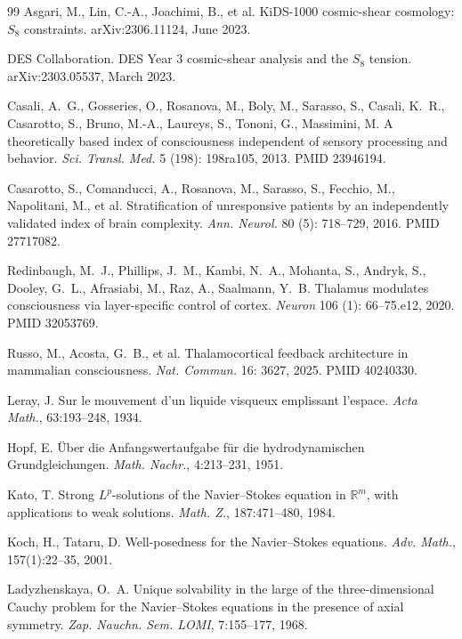 \documentclass[11pt,a4paper]{amsart}
\theoremstyle{plain}
\theoremstyle{definition}
\begin{document}
\begin{thebibliography}{99}
Asgari, M., Lin, C.-A., Joachimi, B., et al.
\newblock KiDS-1000 cosmic-shear cosmology: $S_8$ constraints.
\newblock arXiv:2306.11124, June 2023.

DES Collaboration.
\newblock DES Year 3 cosmic-shear analysis and the $S_8$ tension.
\newblock arXiv:2303.05537, March 2023.

Casali, A.~G., Gosseries, O., Rosanova, M., Boly, M., Sarasso, S., Casali, K.~R., Casarotto, S., Bruno, M.-A., Laureys, S., Tononi, G., Massimini, M.
\newblock A theoretically based index of consciousness independent of sensory processing and behavior.
\newblock \emph{Sci. Transl. Med.} 5 (198): 198ra105, 2013. PMID 23946194.

Casarotto, S., Comanducci, A., Rosanova, M., Sarasso, S., Fecchio, M., Napolitani, M., et al.
\newblock Stratification of unresponsive patients by an independently validated index of brain complexity.
\newblock \emph{Ann. Neurol.} 80 (5): 718--729, 2016. PMID 27717082.

Redinbaugh, M.~J., Phillips, J.~M., Kambi, N.~A., Mohanta, S., Andryk, S., Dooley, G.~L., Afrasiabi, M., Raz, A., Saalmann, Y.~B.
\newblock Thalamus modulates consciousness via layer-specific control of cortex.
\newblock \emph{Neuron} 106 (1): 66--75.e12, 2020. PMID 32053769.

Russo, M., Acosta, G.~B., et al.
\newblock Thalamocortical feedback architecture in mammalian consciousness.
\newblock \emph{Nat. Commun.} 16: 3627, 2025. PMID 40240330.

Leray, J.
\newblock Sur le mouvement d'un liquide visqueux emplissant l'espace.
\newblock \emph{Acta Math.}, 63:193--248, 1934.

Hopf, E.
\newblock \"Uber die Anfangswertaufgabe f\"ur die hydrodynamischen Grundgleichungen.
\newblock \emph{Math. Nachr.}, 4:213--231, 1951.

Kato, T.
\newblock Strong $L^p$-solutions of the Navier--Stokes equation in $\mathbb{R}^m$, with applications to weak solutions.
\newblock \emph{Math. Z.}, 187:471--480, 1984.

Koch, H., Tataru, D.
\newblock Well-posedness for the Navier--Stokes equations.
\newblock \emph{Adv. Math.}, 157(1):22--35, 2001.

Ladyzhenskaya, O.~A.
\newblock Unique solvability in the large of the three-dimensional Cauchy problem for the Navier--Stokes equations in the presence of axial symmetry.
\newblock \emph{Zap. Nauchn. Sem. LOMI}, 7:155--177, 1968.


\end{thebibliography}
\end{document}
